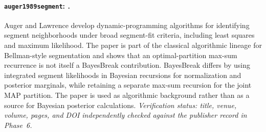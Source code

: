 \paragraph{\texttt{auger1989segment}: \citet{auger1989segment}.}
Auger and Lawrence develop dynamic-programming algorithms for identifying segment neighborhoods under broad segment-fit criteria, including least squares and maximum likelihood. The paper is part of the classical algorithmic lineage for Bellman-style segmentation and shows that an optimal-partition max-sum recurrence is not itself a BayesBreak contribution. BayesBreak differs by using integrated segment likelihoods in Bayesian recursions for normalization and posterior marginals, while retaining a separate max-sum recursion for the joint MAP partition. The paper is used as algorithmic background rather than as a source for Bayesian posterior calculations. \textit{Verification status: title, venue, volume, pages, and DOI independently checked against the publisher record in Phase~6.}
